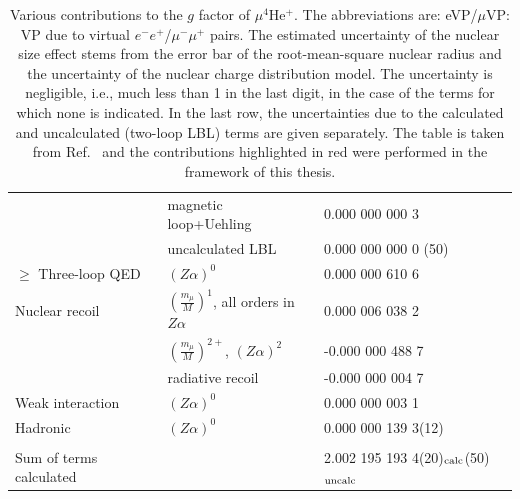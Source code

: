 \begin{table}
\begin{footnotesize}
\begin{tabular}{llll}
                        & magnetic loop+Uehling & \phantom{-}0.000 000 000 3      & \\
                        & uncalculated LBL      & \phantom{-}0.000 000 000 0 (50) & \\
$\ge$ Three-loop QED    & $(Z \alpha)^0$        & \phantom{-}0.000 000 610 6      & \cite{Laporta96,Aoyama07,Aoyama12,CODATA2014} \\
Nuclear recoil          & $\left(\frac{m_{\mu}}{M}\right)^1$, all orders in $Z \alpha$  & \phantom{-}0.000 006 038 2 &  \cite{Shabaev2002}\\
                        & $\left(\frac{m_{\mu}}{M}\right)^{2+}$, $(Z \alpha)^2$ & -0.000 000 488 7 &  \cite{Pachucki2008}\\
                        & radiative recoil      &  -0.000 000 004 7 & \cite{Grotch1970}\\
Weak interaction        & $(Z\alpha)^0$         &  \phantom{-}0.000 000 003 1     & \cite{Czarnecki96,CODATA2014} \\
Hadronic  &  $(Z\alpha)^0$        &  \phantom{-}0.000 000 139 3(12) & \cite{Prades10,Nomura13,Kurz14,CODATA2014} \\
\hline\\
Sum of terms calculated &     &  \multicolumn{2}{l}{\phantom{-}2.002 195 193 4(20)${}_{\rm calc}$(50)${}_{\rm uncalc}$}  \\[8pt]
\end{tabular}
\caption{\label{tab:gHe}Various contributions to the $g$ factor of $\mu{}^4$He$^+$. The abbreviations are:
{eVP}/{$\mu$VP}: VP due to virtual $e^-e^+$/$\mu^- \mu^+$ pairs. The estimated uncertainty of the nuclear size
effect stems from the error bar of the root-mean-square nuclear radius and the uncertainty of the nuclear charge distribution
model. The uncertainty is negligible, i.e., much less than 1 in the last digit, in the case of the terms for which none is indicated.
In the last row, the uncertainties due to the calculated and uncalculated (two-loop LBL) terms are given separately. The table is taken from Ref.~\cite{sikora2018} and the contributions highlighted in red were performed in the framework of this thesis.
}
\end{footnotesize}
\end{table}
%
%



\clearpage
